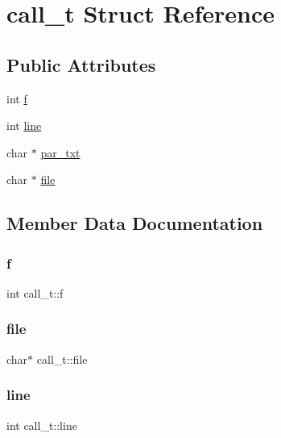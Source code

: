\hypertarget{structcall__t}{}\section{call\+\_\+t Struct Reference}
\label{structcall__t}
\subsection*{Public Attributes}
\begin{DoxyCompactItemize}
\item 
int \hyperlink{structcall__t_a59d4e803f2e254dc5ceeb9c1bfcc9355}{f}
\item 
int \hyperlink{structcall__t_aaa4f0e556289bbf4da414897b10e0916}{line}
\item 
char $\ast$ \hyperlink{structcall__t_a24e185188a17e272396e118640672aba}{par\+\_\+txt}
\item 
char $\ast$ \hyperlink{structcall__t_a97629ec51d024396221fe7d48c84859a}{file}
\end{DoxyCompactItemize}


\subsection{Member Data Documentation}
\mbox{\label{structcall__t_a59d4e803f2e254dc5ceeb9c1bfcc9355}} 
\subsubsection{\texorpdfstring{f}{f}}
{\footnotesize\ttfamily int call\+\_\+t\+::f}

\mbox{\label{structcall__t_a97629ec51d024396221fe7d48c84859a}} 
\subsubsection{\texorpdfstring{file}{file}}
{\footnotesize\ttfamily char$\ast$ call\+\_\+t\+::file}

\mbox{\label{structcall__t_aaa4f0e556289bbf4da414897b10e0916}} 
\subsubsection{\texorpdfstring{line}{line}}
{\footnotesize\ttfamily int call\+\_\+t\+::line}

